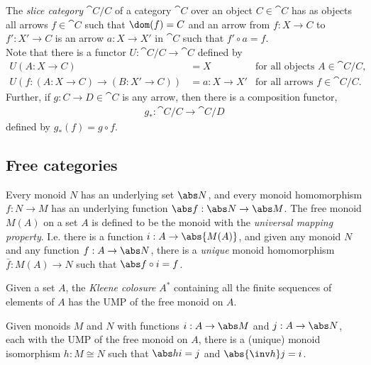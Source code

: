\documentclass{article}
\begin{document}
\begin{definition}
    The \emph{slice category} $\cat C/C$ of a category $\cat C$ over an
    object $C\in\cat C$ has as objects all arrows $f\in\cat C$ such that
    $\dom(f)=C$ and an arrow from $f:X\to C$ to $f':X'\to C$ is an arrow
    $a:X\to X'$ in $\cat C$ such that $f'\circ a = f$.\\
    Note that there is a functor $U:\cat C/C \to \cat C$ defined by
    \begin{align*}
        U(A:X\to C) &= X &\text{for all objects }A\in\cat C/C,\\
        U(f:(A:X\to C)\to(B:X'\to C))&= a:X\to X' &\text{for all arrows }f\in\cat C/C.
    \end{align*}
    Further, if $g:C\to D\in\cat C$ is any arrow, then there is a composition
    functor,
    \begin{align*}
        g_*:\cat C/C\to\cat C/D
    \end{align*}
    defined by $g_*(f)= g\circ f$.
\end{definition}

\subsection{Free categories}

\begin{definition}[UMP of $M(A)$]
    Every monoid $N$ has an underlying set $\abs N$, and every monoid
    homomorphism $f:N\to M$ has an underlying function $\abs f: \abs N
    \to \abs M$.
    The free monoid $M(A)$ on a set $A$ is defined to be
    the monoid with the \emph{universal mapping property}. 
    I.e. there is a function $i:A\to \abs{M(A)}$, and given any
    monoid $N$ and any function $f:A\to\abs N$, there is a
    \emph{unique} monoid homomorphism $\bar f: M(A)\to N$
    such that $\abs f \circ i = f$.
\end{definition}

\begin{proposition}[Awodey 1.9]
    Given a set $A$, the \emph{Kleene colosure} $A^*$ containing 
    all the finite sequences of elements of $A$ has the UMP of the
    free monoid on $A$.
\end{proposition}

\begin{proposition}
    Given monoids $M$ and $N$ with functions $i:A\to\abs M$ and
    $j:A\to\abs N$, each with the UMP of the free monoid on $A$,
    there is a (unique) monoid isomorphism $h:M\cong N$ such that
    $\abs h i=j$ and $\abs{\inv h}j = i$.
\end{proposition}
\end{document}
